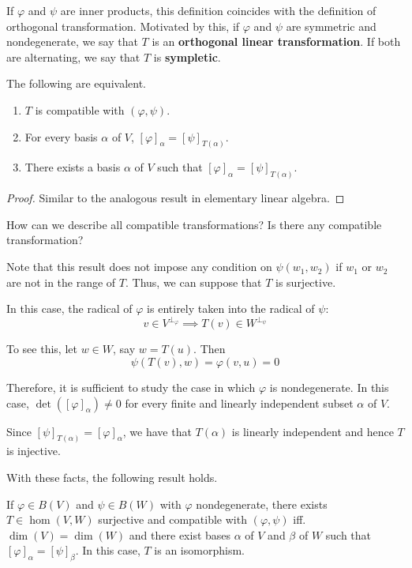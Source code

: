 If $\varphi$ and $\psi$ are inner products, this definition coincides with the definition of orthogonal transformation. Motivated by this, if $\varphi$ and $\psi$ are symmetric and nondegenerate, we say that $T$ is an \textbf{orthogonal linear transformation}. If both are alternating, we say that $T$ is \textbf{sympletic}. 

\begin{theorem}\label{thm:202301030953}
  The following are equivalent.
  \begin{enumerate}
    \item $T$ is compatible with $(\varphi, \psi)$.
    \item For every basis $\alpha$ of $V$, $[\varphi]_\alpha = [\psi]_{T(\alpha)}$.
    \item There exists a basis $\alpha$ of $V$ such that $[\varphi]_\alpha = [\psi]_{T(\alpha)}$.
  \end{enumerate}
\end{theorem}

\begin{proof}
  Similar to the analogous result in elementary linear algebra.
\end{proof}

How can we describe all compatible transformations? Is there any compatible transformation? 

Note that this result does not impose any condition on $\psi(w_1, w_2)$ if $w_1$ or $w_2$ are not in the range of $T$. Thus, we can suppose that $T$ is surjective.

In this case, the radical of $\varphi$ is entirely taken into the radical of $\psi$:
\[
  v \in V^{\perp_\varphi} \implies T(v) \in W^{\perp_\psi}
\]

To see this, let $w \in W$, say $w = T(u)$. Then
\[
  \psi(T(v),w) = \varphi(v,u) = 0
\]

Therefore, it is sufficient to study the case in which $\varphi$ is nondegenerate. In this case, $\det([\varphi]_\alpha) \neq 0$ for every finite and linearly independent subset $\alpha$ of $V$. 

Since $[\psi]_{T(\alpha)} = [\varphi]_\alpha$, we have that $T(\alpha)$ is linearly independent and hence $T$ is injective. 

With these facts, the following result holds.

\begin{theorem}
  If $\varphi \in B(V)$ and $\psi \in B(W)$ with $\varphi$ nondegenerate, there exists $T \in \hom(V,W)$ surjective and compatible with $(\varphi, \psi)$ iff. $\dim(V) = \dim(W)$ and there exist bases $\alpha$ of $V$ and $\beta$ of $W$ such that $[\varphi]_\alpha = [\psi]_\beta$. In this case, $T$ is an isomorphism. 
\end{theorem}

